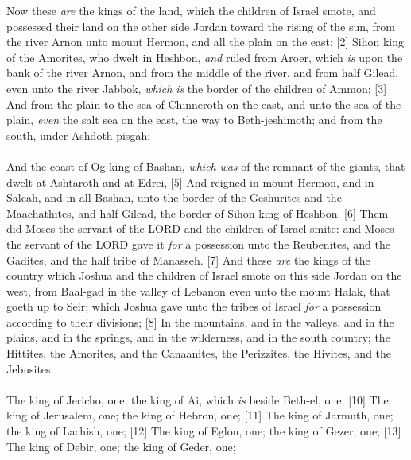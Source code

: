 \textcolor[cmyk]{0.99998,1,0,0}{Now these \emph{are} the kings of the land, which the children of Israel smote, and possessed their land on the other side Jordan toward the rising of the sun, from the river Arnon unto mount Hermon, and all the plain on the east:}
[2] \textcolor[cmyk]{0.99998,1,0,0}{Sihon king of the Amorites, who dwelt in Heshbon, \emph{and} ruled from Aroer, which \emph{is} upon the bank of the river Arnon, and from the middle of the river, and from half Gilead, even unto the river Jabbok, \emph{which} \emph{is} the border of the children of Ammon;}
[3] \textcolor[cmyk]{0.99998,1,0,0}{And from the plain to the sea of Chinneroth on the east, and unto the sea of the plain, \emph{even} the salt sea on the east, the way to Beth-jeshimoth; and from the south, under Ashdoth-pisgah:}\\
\\
\textcolor[cmyk]{0.99998,1,0,0}{And the coast of Og king of Bashan, \emph{which} \emph{was} of the remnant of the giants, that dwelt at Ashtaroth and at Edrei,}
[5] \textcolor[cmyk]{0.99998,1,0,0}{And reigned in mount Hermon, and in Salcah, and in all Bashan, unto the border of the Geshurites and the Maachathites, and half Gilead, the border of Sihon king of Heshbon.}
[6] \textcolor[cmyk]{0.99998,1,0,0}{Them did Moses the servant of the LORD and the children of Israel smite: and Moses the servant of the LORD gave it \emph{for} a possession unto the Reubenites, and the Gadites, and the half tribe of Manasseh.}
[7] \textcolor[cmyk]{0.99998,1,0,0}{And these \emph{are} the kings of the country which Joshua and the children of Israel smote on this side Jordan on the west, from Baal-gad in the valley of Lebanon even unto the mount Halak, that goeth up to Seir; which Joshua gave unto the tribes of Israel \emph{for} a possession according to their divisions;}
[8] \textcolor[cmyk]{0.99998,1,0,0}{In the mountains, and in the valleys, and in the plains, and in the springs, and in the wilderness, and in the south country; the Hittites, the Amorites, and the Canaanites, the Perizzites, the Hivites, and the Jebusites:}\\
\\
\textcolor[cmyk]{0.99998,1,0,0}{The king of Jericho, one; the king of Ai, which \emph{is} beside Beth-el, one;}
[10] \textcolor[cmyk]{0.99998,1,0,0}{The king of Jerusalem, one; the king of Hebron, one;}
[11] \textcolor[cmyk]{0.99998,1,0,0}{The king of Jarmuth, one; the king of Lachish, one;}
[12] \textcolor[cmyk]{0.99998,1,0,0}{The king of Eglon, one; the king of Gezer, one;}
[13] \textcolor[cmyk]{0.99998,1,0,0}{The king of Debir, one; the king of Geder, one;}
